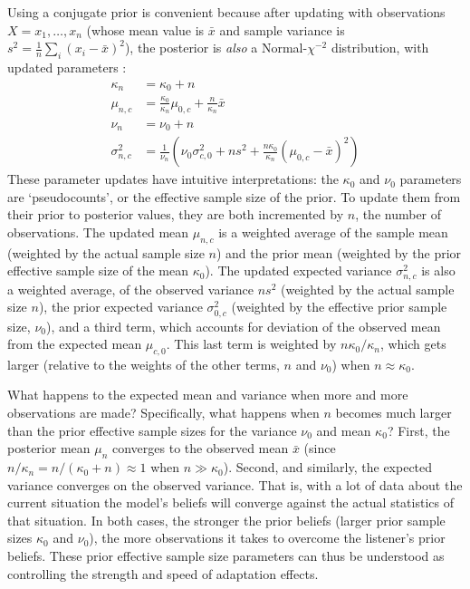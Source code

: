 Using a conjugate prior is convenient because after updating with observations $X = x_1, \ldots, x_n$ (whose mean value is $\bar x$ and sample variance is $s^2 = \frac{1}{n} \sum_i (x_i - \bar x)^2$), the posterior is \emph{also} a Normal-$\chi^{-2}$ distribution, with updated parameters \autocite{Gelman2003}:
\begin{align}
  \label{eq:8}
  \kappa_n &= \kappa_0 + n \\
  \mu_{n,c} &= \frac{\kappa_0}{\kappa_n} \mu_{0,c} + \frac{n}{\kappa_n} \bar x \\
  \nu_n &= \nu_0 + n \\
  \sigma^2_{n,c} &= \frac{1}{\nu_n} ( \nu_0 \sigma^2_{c,0} + n s^2 + \frac{n \kappa_0}{\kappa_n} (\mu_{0,c} - \bar x)^2 )  \label{eq:post-sum-of-squares}
\end{align}
These parameter updates have intuitive interpretations: the $\kappa_0$ and $\nu_0$ parameters are `pseudocounts', or the effective sample size of the prior.  To update them from their prior to posterior values, they are both incremented by $n$, the number of observations.  The updated mean $\mu_{n,c}$ is a weighted average of the sample mean (weighted by the actual sample size $n$) and the prior mean (weighted by the prior effective sample size of the mean $\kappa_0$).  The updated expected variance $\sigma^2_{n,c}$ is also a weighted average, of the observed variance $n s^2$ (weighted by the actual sample size $n$), the prior expected variance $\sigma^2_{0,c}$ (weighted by the effective prior sample size, $\nu_0$), and a third term, which accounts for deviation of the observed mean from the expected mean $\mu_{c,0}$.  This last term is weighted by $n \kappa_0 / \kappa_n$, which gets larger (relative to the weights of the other terms, $n$ and $\nu_0$) when $n \approx \kappa_0$.

What happens to the expected mean and variance when more and more observations are made?  Specifically, what happens when $n$ becomes much larger than the prior effective sample sizes for the variance $\nu_0$ and mean $\kappa_0$?  First, the posterior mean $\mu_n$ converges to the observed mean $\bar x$ (since $n/\kappa_n = n/(\kappa_0+n) \approx 1$ when $n \gg \kappa_0$).  Second, and similarly, the expected variance converges on the observed variance. That is, with a lot of data about the current situation the model's beliefs will converge against the actual statistics of that situation. In both cases, the stronger the prior beliefs (larger prior sample sizes $\kappa_0$ and $\nu_0$), the more observations it takes to overcome the listener's prior beliefs.  These prior effective sample size parameters can thus be understood as controlling the strength and speed of adaptation effects.

